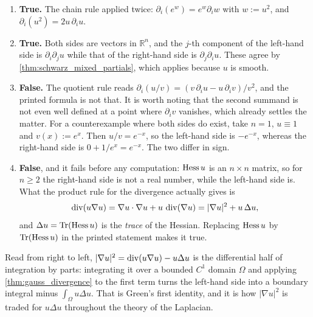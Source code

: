 \begin{exercisesolution}
\label{sol:differential_identities_true_false}
\begin{enumerate}[label=\textbf{(\alph*)}]
  \item \textbf{True.} The chain rule applied twice: $\partial_i(e^{w}) = e^{w}\partial_i w$ with
    $w := u^2$, and $\partial_i(u^2) = 2u\,\partial_i u$.
  \item \textbf{True.} Both sides are vectors in $\mathbb{R}^n$, and the $j$-th component of the
    left-hand side is $\partial_i\partial_j u$ while that of the right-hand side is
    $\partial_j\partial_i u$. These agree by \cref{thm:schwarz_mixed_partials}, which applies
    because $u$ is smooth.
  \item \textbf{False.} The quotient rule reads
    $\partial_i(u/v) = (v\,\partial_i u - u\,\partial_i v)/v^2$, and the printed formula is not
    that. It is worth noting that the second summand is not even well defined at a point where
    $\partial_i v$ vanishes, which already settles the matter. For a counterexample where both
    sides do exist, take $n = 1$, $u \equiv 1$ and $v(x) := e^{x}$. Then $u/v = e^{-x}$, so the
    left-hand side is $-e^{-x}$, whereas the right-hand side is $0 + 1/e^{x} = e^{-x}$. The two
    differ in sign.
  \item \textbf{False}, and it fails before any computation: $\operatorname{Hess} u$ is an $n\times n$ matrix,
    so for $n \geq 2$ the right-hand side is not a real number, while the left-hand side is. What
    the product rule for the divergence actually gives is
    \[\operatorname{div}(u\nabla u) = \nabla u \cdot \nabla u + u\,\operatorname{div}(\nabla u)
      = \lvert\nabla u\rvert^2 + u\,\Delta u ,\]
    and $\Delta u = \operatorname{Tr}(\operatorname{Hess} u)$ is the \emph{trace} of the Hessian. Replacing $\operatorname{Hess} u$ by
    $\operatorname{Tr}(\operatorname{Hess} u)$ in the printed statement makes it true.
\end{enumerate}

\begin{remark}
Read from right to left, $\lvert\nabla u\rvert^2 = \operatorname{div}(u\nabla u) - u\Delta u$ is the
differential half of integration by parts: integrating it over a bounded $C^1$ domain $\Omega$
and applying \cref{thm:gauss_divergence} to the first term turns the left-hand side into a
boundary integral minus $\int_\Omega u\Delta u$. That is Green's first identity, and it is how
$\lvert\nabla u\rvert^2$ is traded for $u\Delta u$ throughout the theory of the Laplacian.
\end{remark}
\end{exercisesolution}

